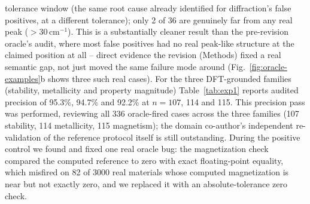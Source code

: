 \documentclass[pdflatex,sn-nature]{sn-jnl}
\begin{document}
tolerance window (the same root cause already identified for diffraction's false
positives, at a different tolerance); only 2 of 36 are genuinely far from any real peak
($>30\,\mathrm{cm}^{-1}$). This is a substantially cleaner result than the pre-revision
oracle's audit, where most false positives had no real peak-like structure at the claimed
position at all -- direct evidence the revision (Methods) fixed a real semantic gap, not
just moved the same failure mode around (Fig.~\ref{fig:oracle-examples}b shows three
such real cases). For the three DFT-grounded families (stability, metallicity and
property magnitude) Table~\ref{tab:exp1} reports audited precision of 95.3\%, 94.7\% and
92.2\% at $n=107$, 114 and 115. This precision pass was performed, reviewing all 336 oracle-fired cases across the three families (107 stability,
114 metallicity, 115 magnetism); the domain co-author's independent re-validation of the
reference protocol itself is still outstanding. During the positive control we found
and fixed one real oracle bug: the magnetization check compared the computed reference to
zero with exact floating-point equality, which misfired on 82 of 3000 real materials
whose computed magnetization is near but not exactly zero, and we replaced it with an
absolute-tolerance zero check.


\end{document}
